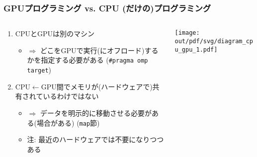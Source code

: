 \documentclass[10pt,dvipdfmx]{beamer}
\newcommand{\ao}[1]{{\color{blue}#1}}
\begin{document}
\begin{frame}
  \frametitle{GPUプログラミング vs. CPU (だけの)プログラミング}
  \begin{columns}
    \begin{column}{0.55\textwidth}
      \begin{enumerate}
      \item CPUとGPUは別のマシン
        \begin{itemize}
        \item $\Rightarrow$ どこをGPUで実行(にオフロード)するかを指定する必要がある
          (\ao{\tt \#pragma omp target})
        \end{itemize}
      \item CPU$\leftarrow$GPU間でメモリが(ハードウェアで)共有されているわけではない
        \begin{itemize}
        \item $\Rightarrow$ データを明示的に移動させる必要がある(場合がある)
          (\ao{\tt map}節)
        \item 注: 最近のハードウェアでは不要になりつつある
        \end{itemize}
      \end{enumerate}
    \end{column}
    \begin{column}{0.5\textwidth}
      \texttt{[image: out/pdf/svg/diagram\_cpu\_gpu\_1.pdf]}
    \end{column}
  \end{columns}
\end{frame}
\end{document}

